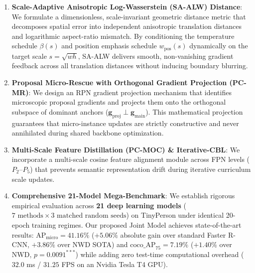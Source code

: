 \begin{enumerate}
    \item \textbf{Scale-Adaptive Anisotropic Log-Wasserstein (SA-ALW) Distance}: We formulate a dimensionless, scale-invariant geometric distance metric that decomposes spatial error into independent anisotropic translation distances and logarithmic aspect-ratio mismatch. By conditioning the temperature schedule $\beta(s)$ and position emphasis schedule $w_{\mathrm{pos}}(s)$ dynamically on the target scale $s = \sqrt{wh}$, SA-ALW delivers smooth, non-vanishing gradient feedback across all translation distances without inducing boundary blurring.
    
    \item \textbf{Proposal Micro-Rescue with Orthogonal Gradient Projection (PC-MR)}: We design an RPN gradient projection mechanism that identifies microscopic proposal gradients and projects them onto the orthogonal subspace of dominant anchors ($\mathbf{g}_{\mathrm{proj}} \perp \mathbf{g}_{\mathrm{main}}$). This mathematical projection guarantees that micro-instance updates are strictly constructive and never annihilated during shared backbone optimization.
    
    \item \textbf{Multi-Scale Feature Distillation (PC-MOC) \& Iterative-CBL}: We incorporate a multi-scale cosine feature alignment module across FPN levels ($P_2\text{--}P_5$) that prevents semantic representation drift during iterative curriculum scale updates.
    
    \item \textbf{Comprehensive 21-Model Mega-Benchmark}: We establish rigorous empirical evaluation across \textbf{21 deep learning models} ($7\text{ methods} \times 3\text{ matched random seeds}$) on TinyPerson under identical 20-epoch training regimes. Our proposed Joint Model achieves state-of-the-art results: $\mathrm{AP}_{\mathrm{micro}} = \mathbf{41.16\%}$ ($+5.06\%$ absolute gain over standard Faster R-CNN, $+3.86\%$ over NWD SOTA) and $\mathrm{coco\_AP}_{75} = \mathbf{7.19\%}$ ($+1.40\%$ over NWD, $p = 0.0091^{***}$) while adding zero test-time computational overhead ($32.0$ ms / $31.25$ FPS on an Nvidia Tesla T4 GPU).
\end{enumerate}
